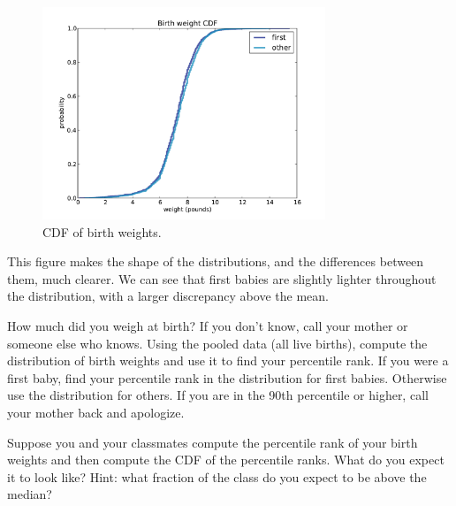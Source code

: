 \documentclass[12pt]{book}
\begin{document}
\begin{figure}
\centerline{\includegraphics[height=2.5in]{figs/nsfg_birthwgt_cdf.pdf}}
\caption{CDF of birth weights.}
\label{nsfg_birthwgt_cdf}
\end{figure}

This figure makes the shape of the distributions, and the differences
between them, much clearer.  We can see that first babies are slightly
lighter throughout the distribution, with a larger discrepancy above 
the mean.




\begin{exercise}
How much did you weigh at birth?  If you don't know, call your mother
or someone else who knows.  Using the pooled data (all live births),
compute the distribution of birth weights and use it to find your
percentile rank.  If you were a first baby, find your percentile rank
in the distribution for first babies.  Otherwise use the distribution
for others.  If you are in the 90th percentile or higher, call your
mother back and apologize.

\end{exercise}

\begin{exercise}
Suppose you and your classmates compute the percentile rank of your
birth weights and then compute the CDF of the percentile ranks.  What do
you expect it to look like?  Hint: what fraction of the class do you
expect to be above the median?

\end{exercise}
\end{document}
